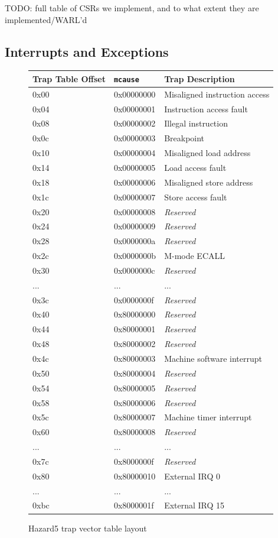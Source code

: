TODO: full table of CSRs we implement, and to what extent they are implemented/WARL'd

\subsection{Interrupts and Exceptions}

\begin{figure}[!htb]
\centering
\caption{Hazard5 trap vector table layout}
\label{table:traps}
\begin{tabular}{l l l}
\hline
Trap Table Offset & {\tt mcause} & Trap Description \\
\hline
0x00 & 0x00000000 & Misaligned instruction access \\
0x04 & 0x00000001 & Instruction access fault \\
0x08 & 0x00000002 & Illegal instruction \\
0x0c & 0x00000003 & Breakpoint \\
0x10 & 0x00000004 & Misaligned load address \\
0x14 & 0x00000005 & Load access fault \\
0x18 & 0x00000006 & Misaligned store address \\
0x1c & 0x00000007 & Store access fault \\
0x20 & 0x00000008 & {\it Reserved} \\
0x24 & 0x00000009 & {\it Reserved} \\
0x28 & 0x0000000a & {\it Reserved} \\
0x2c & 0x0000000b & M-mode ECALL \\
0x30 & 0x0000000c & {\it Reserved} \\
... & ... & ... \\
0x3c & 0x0000000f & {\it Reserved} \\
\hline
0x40 & 0x80000000 & {\it Reserved} \\
0x44 & 0x80000001 & {\it Reserved} \\
0x48 & 0x80000002 & {\it Reserved} \\
0x4c & 0x80000003 & Machine software interrupt \\
0x50 & 0x80000004 & {\it Reserved} \\
0x54 & 0x80000005 & {\it Reserved} \\
0x58 & 0x80000006 & {\it Reserved} \\
0x5c & 0x80000007 & Machine timer interrupt \\
0x60 & 0x80000008 & {\it Reserved} \\
... & ... & ... \\
0x7c & 0x8000000f & {\it Reserved} \\
\hline
0x80 & 0x80000010 & External IRQ 0 \\
... & ... & ... \\
0xbc & 0x8000001f & External IRQ 15 \\
\hline
\end{tabular}
\end{figure}

